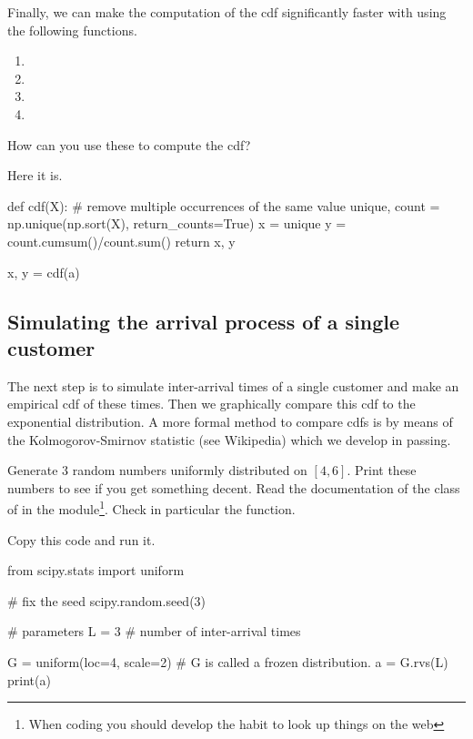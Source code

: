 \begin{exercise}
Finally, we can make the computation of the cdf significantly faster with using the following  functions. 
\begin{enumerate}
\item {}
\item {}
\item {}
\item {}
\end{enumerate}
How can you use these to compute the cdf?
\begin{solution}
Here it is.
\begin{pyblock}

def cdf(X):
    # remove multiple occurrences of the same value
    unique, count = np.unique(np.sort(X), return_counts=True)
    x = unique
    y = count.cumsum()/count.sum()
    return x, y

x, y = cdf(a)
\end{pyblock}

\end{solution}
\end{exercise}

\subsection{Simulating the arrival process of a single customer}
\label{sec:simulations}

The next step is to simulate inter-arrival times of a single customer and  make an empirical cdf of these times.  Then we graphically compare this cdf to the exponential distribution. A more formal method to compare cdfs is by means of the Kolmogorov-Smirnov statistic (see Wikipedia) which we develop in passing.

\begin{exercise}
  Generate 3 random numbers uniformly distributed on $[4,6]$.  Print these numbers to see if you get something decent. Read the documentation of
the  class of in the  module\footnote{When coding you should develop the habit to look up things on the web}.  Check in particular the  function. 

\begin{solution}
Copy this code and run it.
\begin{pyverbatim}
from scipy.stats import uniform

# fix the seed
scipy.random.seed(3) 

# parameters
L = 3  # number of inter-arrival times

G = uniform(loc=4, scale=2) # G is called a frozen distribution.
a = G.rvs(L)
print(a)
\end{pyverbatim}
  
\end{solution}

\end{exercise}


